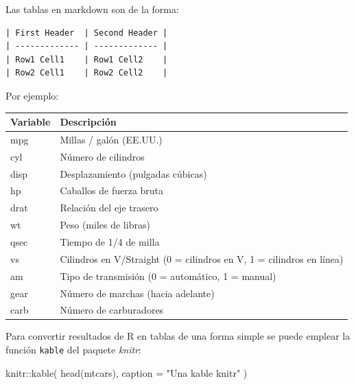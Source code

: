\documentclass[
]{book}
\newenvironment{Shaded}{\begin{snugshade}}{\end{snugshade}}
\newcommand{\AttributeTok}[1]{\textcolor[rgb]{0.77,0.63,0.00}{#1}}
\newcommand{\FunctionTok}[1]{\textcolor[rgb]{0.00,0.00,0.00}{#1}}
\newcommand{\NormalTok}[1]{#1}
\newcommand{\SpecialCharTok}[1]{\textcolor[rgb]{0.00,0.00,0.00}{#1}}
\newcommand{\StringTok}[1]{\textcolor[rgb]{0.31,0.60,0.02}{#1}}
\theoremstyle{break}
\begin{document}
Las tablas en markdown son de la forma:

\begin{verbatim}
| First Header  | Second Header |
| ------------- | ------------- |
| Row1 Cell1    | Row1 Cell2    |
| Row2 Cell1    | Row2 Cell2    |
\end{verbatim}

Por ejemplo:

\begin{longtable}[]{@{}ll@{}}
\toprule
Variable & Descripción \\
\midrule
\endhead
mpg & Millas / galón (EE.UU.) \\
cyl & Número de cilindros \\
disp & Desplazamiento (pulgadas cúbicas) \\
hp & Caballos de fuerza bruta \\
drat & Relación del eje trasero \\
wt & Peso (miles de libras) \\
qsec & Tiempo de 1/4 de milla \\
vs & Cilindros en V/Straight (0 = cilindros en V, 1 = cilindros en línea) \\
am & Tipo de transmisión (0 = automático, 1 = manual) \\
gear & Número de marchas (hacia adelante) \\
carb & Número de carburadores \\
\bottomrule
\end{longtable}

Para convertir resultados de R en tablas de una forma simple se puede emplear la función \texttt{kable} del paquete \emph{knitr}:

\begin{Shaded}
\begin{Highlighting}[]
\NormalTok{knitr}\SpecialCharTok{::}\FunctionTok{kable}\NormalTok{(}
  \FunctionTok{head}\NormalTok{(mtcars), }
  \AttributeTok{caption =} \StringTok{"Una kable knitr"}
\NormalTok{)}
\end{Highlighting}
\end{Shaded}
\end{document}
